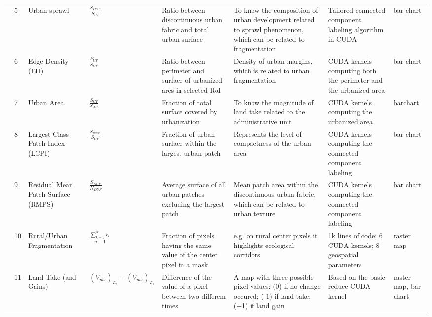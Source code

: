 \documentclass[APA,LATO1COL,doublespace]{WileyNJD-v2}
\begin{document}
\begin{table}[b]
\begin{tabular}{m{0.3cm} p{0.1cm} p{1.2cm} p{3.5cm} *{3}{p{2.7cm}} p{1.0cm} }
    \midrule
    
    & 5 & Urban sprawl & 
    $\frac{S_{DUF}}{S_{UT}}$ 
    & Ratio between discontinuous urban fabric and total urban surface & To know the composition of urban development related to sprawl phenomenon, which can be related to fragmentation & Tailored connected component labeling algorithm in CUDA & bar chart \\
    
    & 6 & Edge Density (ED) &
    $\frac{P_{UT}}{S_{UT}}$ 
    & Ratio between perimeter and surface of urbanized ares in selected RoI & Density of urban margins, which is related to urban fragmentation & CUDA kernels computing both the perimeter and the urbanized area & bar chart \\
    
    & 7 & Urban Area &
    $\frac{S_{UT}}{S_{AU}}$ 
    & Fraction of total surface covered by urbanization & To know the magnitude of land take related to the administrative unit & CUDA kernels computing the urbanized area	& barchart \\
    
    & 8	& Largest Class Patch Index (LCPI) & 
    $\frac{S_{max}}{S_{UT}}$ 
    & Fraction of urban surface within the largest urban patch & Represents the level of compactness of the urban area & CUDA kernels computing the connected component labeling	& bar chart \\
    
    & 9	& Residual Mean Patch Surface (RMPS) &
    $\frac{S_{DUF}}{N_{DUF}}$ 
    & Average surface of all urban patches excluding the largest patch & Mean patch area within the discontinuous urban fabric, which can be related to urban texture & CUDA kernels computing the connected component labeling & bar chart \\
    
    & 10 & Rural/Urban Fragmentation &
    $\frac{\sum^{N}_{k=1} V_k}{ n-1 }$ 
    & Fraction of pixels having the same value of the center pixel in a mask & e.g. on rural center pixels it highlights ecological corridors & 1k lines of code; 6 CUDA kernels; 8 geospatial parameters & raster map \\
    
    & 11 & Land Take (and Gains) &
    $ \left( V_{pix} \right)_{T_2} - \left( V_{pix} \right)_{T_1}$ 
    & Difference of the value of a pixel between two differenr times & A map with three possible pixel values: (0) if no change occured; (-1) if land take; (+1) if land gain & Based on the basic reduce CUDA kernel & raster map, bar chart \\
    

\end{tabular}
\end{table}
\end{document}
